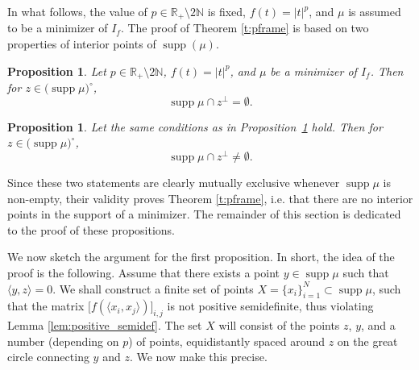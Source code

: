 \documentclass[11pt, leqno]{amsart}
\newtheorem{proposition}[theorem]{Proposition}
\theoremstyle{definition}
\numberwithin{equation}{section}
\begin{document}
  In what follows, the value of $p \in \mathbb R_+ \setminus 2 \mathbb N$ is fixed, $f(t) = |t|^p$, and $\mu$ is assumed to be a minimizer of  $I_f$.  The proof of Theorem \ref{t:pframe} is based on two properties of interior points of $\operatorname{supp} (\mu) $.

\begin{proposition}\label{prop:I}
Let $p \in \mathbb R_+ \setminus 2 \mathbb N$, $f(t) = |t|^p$, and $\mu$ be a minimizer of  $I_f$. Then for $z \in \big( \operatorname{supp} \mu  \big)^\circ$, $$\operatorname{supp} \mu  \cap  z^\perp  = \emptyset.$$
\end{proposition}

\begin{proposition}\label{prop:II}
Let the same  conditions as in Proposition~\ref{prop:I} hold. Then for $z \in \big( \operatorname{supp} \mu \big)^\circ$, $$\operatorname{supp} \mu  \cap  z^\perp  \neq \emptyset.$$
\end{proposition}

Since these two statements are  clearly mutually exclusive whenever $\operatorname{supp} \mu$ is non-empty, their validity proves Theorem \ref{t:pframe}, i.e. that there are no interior points in the support of a minimizer. The remainder of this section is dedicated to the proof of these propositions. 

We now sketch the argument for the first proposition. In short, the idea of the proof is the following. Assume that there exists a point $y \in \operatorname{supp} \mu$ such that  $\langle y ,  z \rangle= 0$. We shall construct a finite set of points $X = \big\{x_i \big\}_{i=1}^N 
 \subset \operatorname{supp} \mu$, 
 such that the matrix $\big[ f (\langle x_i , x_j \rangle ) \big]_{i,j}$ 
 is not positive semidefinite, thus violating Lemma \ref{lem:positive_semidef}.  The set $X$ will consist of the points $z$, $y$, and a number (depending on $p$) of points, equidistantly spaced around $z$ on the great circle connecting $y$ and $z$. We now make this precise.
\end{document}
